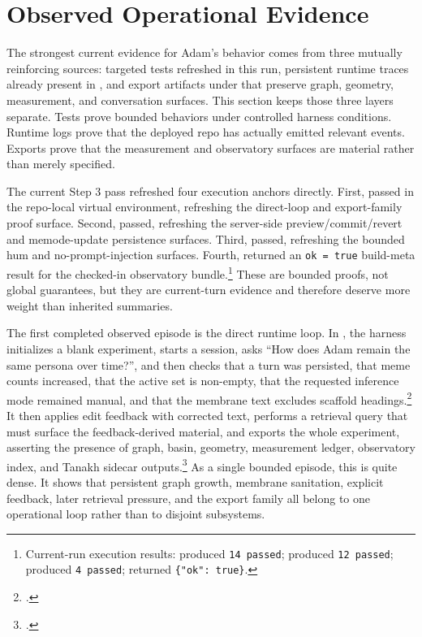 \documentclass[10pt]{article}
\begin{document}
\section{Observed Operational Evidence}

The strongest current evidence for Adam's behavior comes from three mutually reinforcing sources: targeted tests refreshed in this run, persistent runtime traces already present in , and export artifacts under  that preserve graph, geometry, measurement, and conversation surfaces. This section keeps those three layers separate. Tests prove bounded behaviors under controlled harness conditions. Runtime logs prove that the deployed repo has actually emitted relevant events. Exports prove that the measurement and observatory surfaces are material rather than merely specified.

The current Step 3 pass refreshed four execution anchors directly. First,  passed in the repo-local virtual environment, refreshing the direct-loop and export-family proof surface. Second,  passed, refreshing the server-side preview/commit/revert and memode-update persistence surfaces. Third,  passed, refreshing the bounded hum and no-prompt-injection surfaces. Fourth,  returned an \texttt{ok = true} build-meta result for the checked-in observatory bundle.\footnote{Current-run execution results:  produced \texttt{14 passed};  produced \texttt{12 passed};  produced \texttt{4 passed};  returned \texttt{\{"ok": true\}}.} These are bounded proofs, not global guarantees, but they are current-turn evidence and therefore deserve more weight than inherited summaries.

The first completed observed episode is the direct runtime loop. In , the harness initializes a blank experiment, starts a session, asks ``How does Adam remain the same persona over time?'', and then checks that a turn was persisted, that meme counts increased, that the active set is non-empty, that the requested inference mode remained manual, and that the membrane text excludes scaffold headings.\footnote{.} It then applies edit feedback with corrected text, performs a retrieval query that must surface the feedback-derived material, and exports the whole experiment, asserting the presence of graph, basin, geometry, measurement ledger, observatory index, and Tanakh sidecar outputs.\footnote{.} As a single bounded episode, this is quite dense. It shows that persistent graph growth, membrane sanitation, explicit feedback, later retrieval pressure, and the export family all belong to one operational loop rather than to disjoint subsystems.
\end{document}

